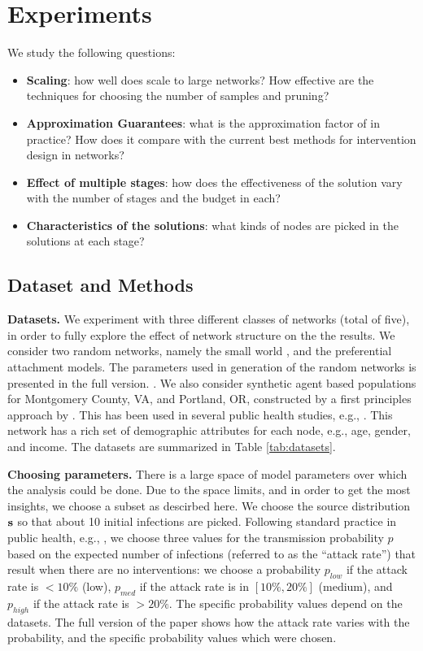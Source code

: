 \section{Experiments}
\label{sec:experiments}

We study the following questions:
\begin{itemize}
\item
\textbf{Scaling}: how well does \algo{} scale to large networks? How effective are the techniques for choosing the
number of samples and pruning?
\item
\textbf{Approximation Guarantees}: what is the approximation factor of \algo{} in practice? How does it compare with 
the current best methods for intervention design in networks?
\item
\textbf{Effect of multiple stages}: how does the effectiveness of the solution vary with the number of stages
and the budget in each?
\item
\textbf{Characteristics of the solutions}: what kinds of nodes are picked in the solutions at each stage?
\end{itemize}

\subsection{Dataset and Methods}

\noindent
\textbf{Datasets.}
We experiment with three different classes of networks (total of five),
in order to fully explore the effect of network structure on the the results. 
We consider two random networks, namely the small world 
\cite{Kleinberg00thesmall-world}, and the preferential attachment \cite{Barabasi509} models. The parameters used in generation of the random networks is presented in the full version. \cite{fullpaper}. We also consider synthetic agent based populations for Montgomery County, VA, and Portland, OR, constructed by a first principles approach by \cite{barrett:wsc09,eubank:nature04}. This has been used in several public health studies, e.g., \cite{singh:bmc19}. This network has a rich set of demographic attributes for each node, e.g., age, gender, and income.
The datasets are summarized in Table \ref{tab:datasets}.

\noindent
\textbf{Choosing parameters.}
There is a large space of model parameters over which the analysis could be done. Due to the space limits, and
in order to get the most insights, we choose a subset as descirbed here.
We choose the source distribution $\mathbf{s}$ so that about 10 initial infections are picked.
Following standard practice in public health, e.g., \cite{halloran:pnas08},
we choose three values for the transmission probability $p$ based on the expected number of infections (referred to as the ``attack rate'') 
that result when there are no interventions: we choose a probability $p_{low}$ if the attack rate is $<10\%$ (low),
$p_{med}$ if the attack rate is in $[10\%, 20\%]$ (medium), and
$p_{high}$ if the attack rate is $> 20\%$.
The specific probability values depend on the datasets.
The full version of the paper \cite{fullversion} shows how the attack rate varies with the probability, and the specific probability values which were chosen.

